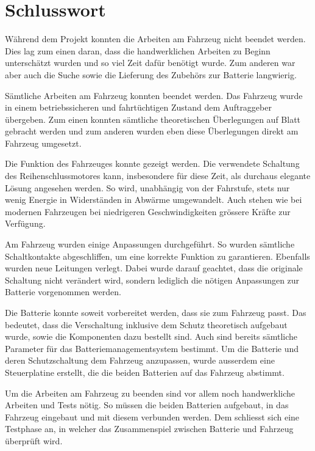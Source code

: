 \chapter{Schlusswort}
\color{red}
Während dem Projekt konnten die Arbeiten am Fahrzeug nicht beendet werden. Dies lag zum einen daran, dass die handwerklichen Arbeiten zu Beginn unterschätzt wurden und so viel Zeit dafür benötigt wurde. Zum anderen war aber auch die Suche sowie die Lieferung des Zubehörs zur Batterie langwierig.
\color{black}

\color{blue}
Sämtliche Arbeiten am Fahrzeug konnten beendet werden. Das Fahrzeug wurde in einem betriebssicheren und fahrtüchtigen Zustand dem Auftraggeber übergeben. Zum einen konnten sämtliche theoretischen Überlegungen auf Blatt gebracht werden und zum anderen wurden eben diese Überlegungen direkt am Fahrzeug umgesetzt.
\color{black}

Die Funktion des Fahrzeuges konnte gezeigt werden. Die verwendete Schaltung des Reihenschlussmotores kann, insbesondere für diese Zeit, als durchaus elegante Lösung angesehen werden. So wird, unabhängig von der Fahrstufe, stets nur wenig Energie in Widerständen in Abwärme umgewandelt. Auch stehen wie bei modernen Fahrzeugen bei niedrigeren Geschwindigkeiten grössere Kräfte zur Verfügung.

Am Fahrzeug wurden einige Anpassungen durchgeführt. So wurden sämtliche Schaltkontakte abgeschliffen, um eine korrekte Funktion zu garantieren. Ebenfalls wurden neue Leitungen verlegt. Dabei wurde darauf geachtet, dass die originale Schaltung nicht verändert wird, sondern lediglich die nötigen Anpassungen zur Batterie vorgenommen werden.

\color{red}
Die Batterie konnte soweit vorbereitet werden, dass sie zum Fahrzeug passt. Das bedeutet, dass die Verschaltung inklusive dem Schutz theoretisch aufgebaut wurde, sowie die Komponenten dazu bestellt sind. Auch sind bereits sämtliche Parameter für das Batteriemanagementsystem bestimmt. Um die Batterie und deren Schutzschaltung dem Fahrzeug anzupassen, wurde ausserdem eine Steuerplatine erstellt, die die beiden Batterien auf das Fahrzeug abstimmt.

Um die Arbeiten am Fahrzeug zu beenden sind vor allem noch handwerkliche Arbeiten und Tests nötig. So müssen die beiden Batterien aufgebaut, in das Fahrzeug eingebaut und mit diesem verbunden werden. Dem schliesst sich eine Testphase an, in welcher das Zusammenspiel zwischen Batterie und Fahrzeug überprüft wird.
\color{black}

